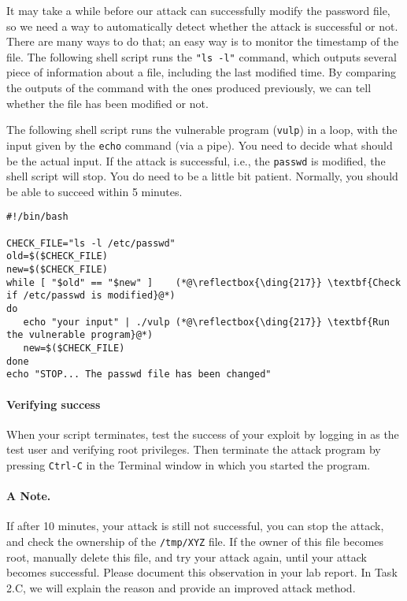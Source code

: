 It may take a while before our attack can successfully modify the
password file, so we need a way to automatically detect whether the attack is
successful or not. There are many ways to do that; an easy way 
is to monitor the timestamp of the file.
The following shell script runs the \texttt{"ls -l"} command, which
outputs several piece of information about a
file, including the last modified time. By comparing the outputs of the
command with the ones produced previously, we can tell
whether the file has been modified or not. 

The following shell script runs the vulnerable program (\texttt{vulp}) in a loop,
with the input given by the \texttt{echo} command (via a pipe).  
You need to decide what should be the actual input. 
If the attack is successful, i.e.,
the \texttt{passwd} is modified, the shell script will stop. 
You do need to be a little bit patient. 
Normally, you should be able to succeed within 5 minutes. 

\begin{lstlisting}
#!/bin/bash

CHECK_FILE="ls -l /etc/passwd"
old=$($CHECK_FILE)
new=$($CHECK_FILE)
while [ "$old" == "$new" ]    (*@\reflectbox{\ding{217}} \textbf{Check if /etc/passwd is modified}@*)
do
   echo "your input" | ./vulp (*@\reflectbox{\ding{217}} \textbf{Run the vulnerable program}@*)
   new=$($CHECK_FILE)
done
echo "STOP... The passwd file has been changed"
\end{lstlisting}

\paragraph{Verifying success}
When your script terminates,
test the success of your exploit by logging in as the test user and
verifying root privileges.  Then terminate the attack program by 
pressing \texttt{Ctrl-C} in the Terminal window in which you started the program.


\paragraph{A Note.}
If after 10 minutes, your attack is still not 
successful, you can stop the attack, and check the ownership
of the \texttt{/tmp/XYZ} file. If the owner of this file
becomes root, manually delete this file, and try your 
attack again, until your attack becomes successful. 
Please document this observation in your lab report. 
In Task 2.C, we will explain the reason and provide
an improved attack method. 



